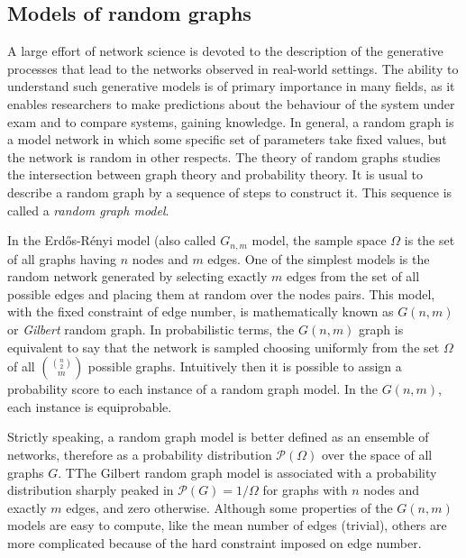 \subsection{Models of random graphs}\label{sec:models_random_graph}
A large effort of network science is devoted to the description of the generative processes that lead to the networks observed in real-world settings.
The ability to understand such generative models is of primary importance in many fields, as it enables researchers to make predictions about the behaviour of the system under exam and to compare systems, gaining knowledge.
In general, a random graph is a model network in which some specific set of parameters take fixed values, but the network is random in other respects.
The theory of random graphs studies the intersection between graph theory and probability theory.
It is usual to describe a random graph by a sequence of steps to construct it. This sequence is called a \emph{random graph model}.

In the Erd\H{o}s-Rényi model (also called $G_{n,m}$ model, the sample space $\Omega$ is the set of all graphs having $n$ nodes and $m$ edges.
One of the simplest models is the random network generated by selecting exactly $m$ edges from the set of all possible edges and placing them at random over the nodes pairs.
This model, with the fixed constraint of edge number, is mathematically known as $G(n,m)$ or \emph{Gilbert} random graph.
In probabilistic terms, the $G(n,m)$ graph is equivalent to say that the network is sampled choosing uniformly from the set $\Omega$ of all $\binom{\binom{n}{2}}{m}$ possible graphs.
Intuitively then it is possible to assign a probability score to each instance of a random graph model.
In the $G(n,m)$, each instance is equiprobable.

Strictly speaking, a random graph model is better defined as an ensemble of networks, therefore as a probability distribution $\mathcal{P}(\Omega)$ over the space of all graphs $G$.
TThe Gilbert random graph model is associated with a probability distribution sharply peaked in $\mathcal{P}(G)=1/\Omega$ for graphs with $n$ nodes and exactly $m$ edges, and zero otherwise.
Although some properties of the $G(n,m)$ models are easy to compute, like the mean number of edges (trivial), others are more complicated because of the hard constraint imposed on edge number.

